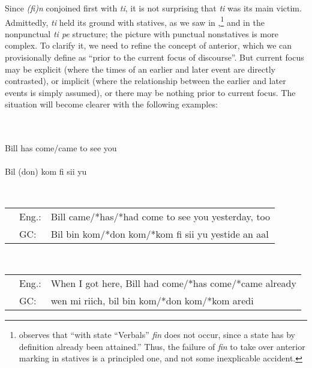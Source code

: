 Since \textit{(fi)n} conjoined first with \textit{ti}, it is not surprising that \textit{ti} was its main victim. Admittedly, \textit{ti} held its ground with statives, as we saw in ,\footnote{\citet{Corne1981} observes that ``with state ``Verbals'' \textit{fin} does not occur, since a state has by definition already been attained.'' Thus, the failure of \textit{fin} to take over anterior marking in statives is a principled one, and not some inexplicable accident.} and in the nonpunctual \textit{ti pe} structure; the picture with punctual nonstatives is more complex. To clarify it, we need to refine the concept of anterior, which we can provisionally define as ``prior to the current focus of discourse''. But current focus may be explicit (where the times of an earlier and later event are directly contrasted), or implicit (where the relationship between the earlier and later events is simply assumed), or there may be nothing prior to current focus. The situation will become clearer with the following examples:


\ea\label{ex:2:103}
\\
\ea 
\langinfo{\langEng}{}{}\\
Bill has come/came to see you\\
\ex 
\langinfo{\langGC}{}{}\\
Bil (don) kom fi sii yu\\
\z
\z

\ea\label{ex:2:104}
\\
\begin{tabular}{lll}
& Eng.: & Bill came/*has/*had come to see you yesterday, too\\
& GC: & Bil bin kom/*don kom/*kom fi sii yu yestide an aal
\end{tabular}
\z


\ea\label{ex:2:105}
\\
\begin{tabular}{lll}
& Eng.: & When I got here, Bill had come/*has come/*came already\\
& GC: & wen mi riich, bil bin kom/*don kom/*kom aredi
\end{tabular}
\z


